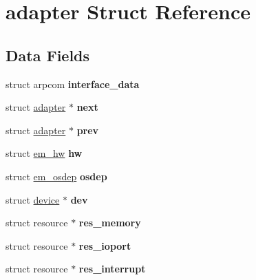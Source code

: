 \hypertarget{structadapter}{}\section{adapter Struct Reference}
\label{structadapter}
\subsection*{Data Fields}
\begin{DoxyCompactItemize}
\item 
\mbox{\label{structadapter_ab33bc662db65f5947d45d06da8430785}} 
struct arpcom {\bfseries interface\+\_\+data}
\item 
\mbox{\label{structadapter_aa14a4eae25964b9de841b2cce87072e5}} 
struct \mbox{\hyperlink{structadapter}{adapter}} $\ast$ {\bfseries next}
\item 
\mbox{\label{structadapter_aafe98dbc51f3b7a88aec1f5125134156}} 
struct \mbox{\hyperlink{structadapter}{adapter}} $\ast$ {\bfseries prev}
\item 
\mbox{\label{structadapter_ac016165686fa9c29cc5633091a245ac1}} 
struct \mbox{\hyperlink{structem__hw}{em\+\_\+hw}} {\bfseries hw}
\item 
\mbox{\label{structadapter_a3f6ed03ded6248f776023da2017122de}} 
struct \mbox{\hyperlink{structem__osdep}{em\+\_\+osdep}} {\bfseries osdep}
\item 
\mbox{\label{structadapter_abb5ff600e458f37ea2fc74e85f2334ed}} 
struct \mbox{\hyperlink{structdevice}{device}} $\ast$ {\bfseries dev}
\item 
\mbox{\label{structadapter_aa426480a0f7789d587a550b1174e7b8b}} 
struct resource $\ast$ {\bfseries res\+\_\+memory}
\item 
\mbox{\label{structadapter_a0e9ef09bdb8438ded52ca16324df6aa7}} 
struct resource $\ast$ {\bfseries res\+\_\+ioport}
\item 
\mbox{\label{structadapter_a1d9590ab413812eeaaefe94d6092838b}} 
struct resource $\ast$ {\bfseries res\+\_\+interrupt}

\end{DoxyCompactItemize}
